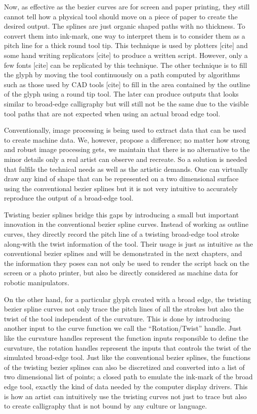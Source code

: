    Now, as effective as the bezier curves are for screen and paper printing, they still cannot tell how a physical tool should move on a piece of paper to create the desired output. The splines are just organic shaped paths with no thickness. To convert them into ink-mark, one way to interpret them is to consider them as a pitch line for a thick round tool tip. This technique is used by plotters [cite] and some hand writing replicators [cite] to produce a written script. However, only a few fonts [cite] can be replicated by this technique. The other technique is to fill the glyph by moving the tool continuously on a path computed by algorithms such as those used by CAD tools [cite] to fill in the area contained by the outline of the glyph using a round tip tool. The later can produce outputs that looks similar to broad-edge calligraphy but will still not be the same due to the visible tool paths that are not expected when using an actual broad edge tool.

    Conventionally, image processing is being used to extract data that can be used to create machine data. We, however, propose a difference; no matter how strong and robust image processing gets, we maintain that there is no alternative to the minor details only a real artist can observe and recreate. So a solution is needed that fulfils the technical needs as well as the artistic demands. One can virtually draw any kind of shape that can be represented on a two dimensional surface using the conventional bezier splines but it is not very intuitive to accurately reproduce the output of a broad-edge tool.

    Twisting bezier splines bridge this gaps by introducing a small but important innovation in the conventional bezier spline curves. Instead of working as outline curves, they directly record the pitch line of a twisting broad-edge tool stroke along-with the twist information of the tool. Their usage is just as intuitive as the conventional bezier splines and will be demonstrated in the next chapters, and the information they poses can not only be used to render the script back on the screen or a photo printer, but also be directly considered as machine data for robotic manipulators.

    On the other hand, for a particular glyph created with a broad edge, the twisting bezier spline curves not only trace the pitch lines of all the strokes but also the twist of the tool independent of the curvature. This is done by introducing another input to the curve function we call the ``Rotation/Twist'' handle. Just like the curvature handles represent the function inputs responsible to define the curvature, the rotation handles represent the inputs that controls the twist of the simulated broad-edge tool. Just like the conventional bezier splines, the functions of the twisting bezier splines can also be discretized and converted into a list of two dimensional list of points; a closed path to emulate the ink-mark of the broad edge tool, exactly the kind of data needed by the computer display drivers. This is how an artist can intuitively use the twisting curves not just to trace but also to create calligraphy that is not bound by any culture or language.

